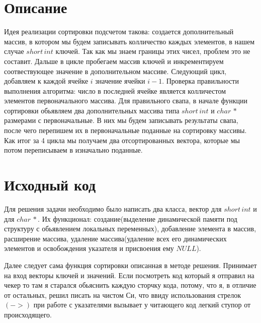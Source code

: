 \section{Описание}

Идея реализации сортировки подсчетом такова: создается дополнительный массив, в котором мы будем записывать колличество каждых элементов, в нашем случае $short\,int$ ключей. Так как мы знаем границы этих чисел, проблем это не составит. Дальше в цикле пробегаем массив ключей и инкрементируем соотвествующее значение в дополнительном массиве. Следующий цикл, добавляем к каждой ячейке $i$ значение ячейки $i - 1$. Проверка правильности выполнения алгоритма: число в последней ячейке является колличестом элементов первоначального массива. Для правильного свапа, в начале функции сортировки обьявляем два дополнительных массива типа $short\,int$ и $char\,*$ размерами с первоначальные. В них мы будем записывать результаты свапа, после чего перепишем их в первоначальные поданные на сортировку массивы. Как итог за 4 цикла мы получаем два отсортированных вектора, которые мы потом переписываем в изначально поданные.

\pagebreak

\section{Исходный код}

Для решения задачи необходимо было написать два класса, вектор для $short\,int$ и для $char\,*$. Их функционал: создание(выделение динамической памяти под структуру с обьявлением локальных переменных), добавление элемента в массив, расширение массива, удаление массива(удаление всех его динамических элементов и освобождения указателя и присвоения ему $NULL$).

Далее следует сама функция сортировки описанная в методе решения. Принимает на вход векторы ключей и значений. Если посмотреть код который я отправил на чекер то там я старался обьяснить каждую сторчку кода, потому, что я, в отличие от остальных, решил писать на чистом Си, что ввиду использования  стрелок $(->)$ при работе с указателями вызывает у читающего код легкий ступор от происходящего.

